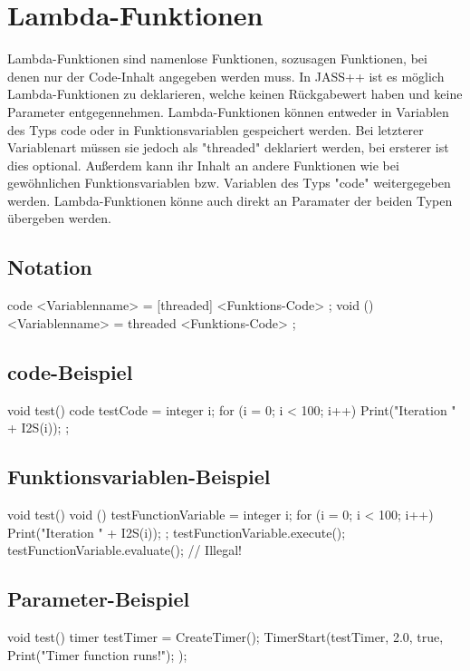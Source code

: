 \chapter{Lambda-Funktionen}

Lambda-Funktionen sind namenlose Funktionen, sozusagen Funktionen, bei denen nur der Code-Inhalt angegeben werden muss.
In JASS++ ist es möglich Lambda-Funktionen zu deklarieren, welche keinen Rückgabewert haben und keine Parameter entgegennehmen.
Lambda-Funktionen können entweder in Variablen des Typs code oder in Funktionsvariablen gespeichert werden. Bei letzterer Variablenart
müssen sie jedoch als "threaded" deklariert werden, bei ersterer ist dies optional.
Außerdem kann ihr Inhalt an andere Funktionen wie bei gewöhnlichen Funktionsvariablen bzw. Variablen des Typs "code" weitergegeben
werden.
Lambda-Funktionen könne auch direkt an Paramater der beiden Typen übergeben werden.

\section{Notation}
code <Variablenname> = [threaded] { <Funktions-Code> };
void () <Variablenname> = threaded { <Funktions-Code> };

\section{code-Beispiel}
void test()
{
	code testCode = { integer i; for (i = 0; i < 100; i++) { Print("Iteration " + I2S(i)); } };
}

\section{Funktionsvariablen-Beispiel}
void test()
{
	void () testFunctionVariable = { integer i; for (i = 0; i < 100; i++) { Print("Iteration " + I2S(i)); } };
	testFunctionVariable.execute();
	testFunctionVariable.evaluate(); // Illegal!
}

\section{Parameter-Beispiel}
void test()
{
	timer testTimer = CreateTimer();
	TimerStart(testTimer, 2.0, true, { Print("Timer function runs!"); });
} 